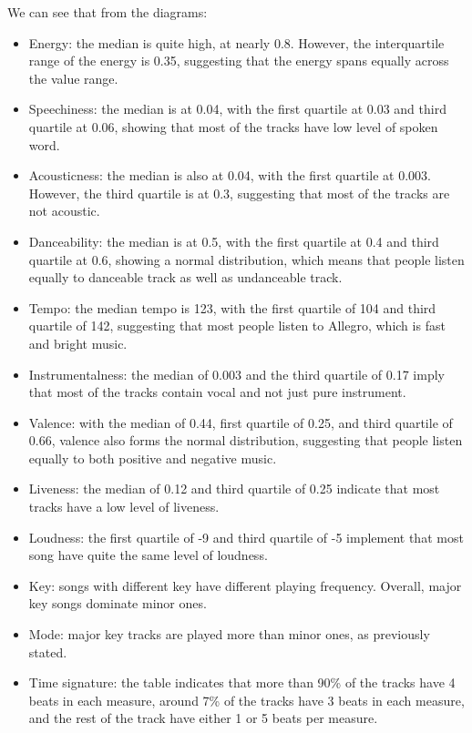 \noindent We can see that from the diagrams:
\begin{itemize}
	\item Energy: the median is quite high, at nearly 0.8. However, the interquartile range of the energy is 0.35, suggesting that the energy spans equally across the value range.
	\item Speechiness: the median is at 0.04, with the first quartile at 0.03 and third quartile at 0.06, showing that most of the tracks have low level of spoken word. 
	\item Acousticness: the median is also at 0.04, with the first quartile at 0.003. However, the third quartile is at 0.3, suggesting that most of the tracks are not acoustic.
	\item Danceability: the median is at 0.5, with the first quartile at 0.4 and third quartile at 0.6, showing a normal distribution, which means that people listen equally to danceable track as well as undanceable track.
	\item Tempo: the median tempo is 123, with the first quartile of 104 and third quartile of 142, suggesting that most people listen to Allegro, which is fast and bright music.
	\item Instrumentalness: the median of 0.003 and the third quartile of 0.17 imply that most of the tracks contain vocal and not just pure instrument.
	\item Valence: with the median of 0.44, first quartile of 0.25, and third quartile of 0.66, valence also forms the normal distribution, suggesting that people listen equally to both positive and negative music.
	\item Liveness: the median of 0.12 and third quartile of 0.25 indicate that most tracks have a low level of liveness.
	\item Loudness: the first quartile of -9 and third quartile of -5 implement that most song have quite the same level of loudness.
	\item Key: songs with different key have different playing frequency. Overall, major key songs dominate minor ones.
	\item Mode: major key tracks are played more than minor ones, as previously stated.
	\item Time signature: the table indicates that more than 90\% of the tracks have 4 beats in each measure, around 7\% of the tracks have 3 beats in each measure, and the rest of the track have either 1 or 5 beats per measure.
\end{itemize}
	


